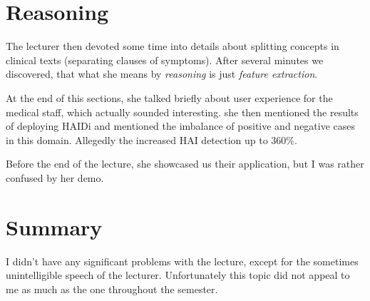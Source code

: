 \documentclass[a4paper]{article}
\begin{document}
\hspace{2cm}

\section*{Reasoning}
The lecturer then devoted some time into details about splitting concepts in clinical texts (separating clauses of symptoms). After several minutes we discovered, that what she means by \textit{reasoning} is just \textit{feature extraction}.

At the end of this sections, she talked briefly about user experience for the medical staff, which actually sounded interesting. she then mentioned the results of deploying HAIDi and mentioned the imbalance of positive and negative cases in this domain. Allegedly the increased HAI detection up to 360\%.

Before the end of the lecture, she showcased us their application, but I was rather confused by her demo.

\section*{Summary}
I didn't have any significant problems with the lecture, except for the sometimes unintelligible speech of the lecturer. Unfortunately this topic did not appeal to me as much as the one throughout the semester.
\end{document}
